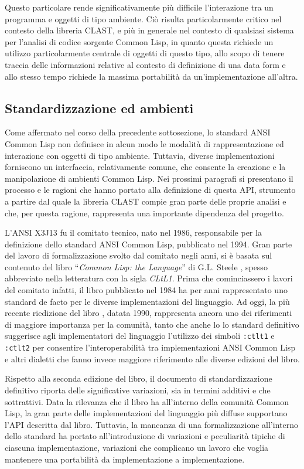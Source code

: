Questo particolare rende significativamente più difficile l'interazione tra un
programma e oggetti di tipo ambiente. Ciò risulta particolarmente critico nel
contesto della libreria CLAST, e più in generale nel contesto di qualsiasi
sistema per l'analisi di codice sorgente Common Lisp, in quanto questa richiede
un utilizzo particolarmente centrale di oggetti di questo tipo, allo scopo di
tenere traccia delle informazioni relative al contesto di definizione di una
data form e allo stesso tempo richiede la massima portabilità da
un'implementazione all'altra.

\subsection{Standardizzazione ed ambienti}

Come affermato nel corso della precedente sottosezione, lo standard ANSI Common
Lisp non definisce in alcun modo le modalità di rappresentazione ed interazione
con oggetti di tipo ambiente. Tuttavia, diverse implementazioni forniscono un
interfaccia, relativamente comune, che consente la creazione e la manipolazione
di ambienti Common Lisp. Nei prossimi paragrafi si presentano il processo e le
ragioni che hanno portato alla definizione di questa API, strumento a partire
dal quale la libreria CLAST compie gran parte delle proprie analisi e che, per
questa ragione, rappresenta una importante dipendenza del progetto.

L’ANSI X3J13 fu il comitato tecnico, nato nel 1986, responsabile per la
definizione dello standard ANSI Common Lisp, pubblicato nel 1994. Gran parte del
lavoro di formalizzazione svolto dal comitato negli anni, si è basata sul
contenuto del libro \enquote{\textit{Common Lisp: the Language}} di G.L. Steele
\cite{steele1984common}, spesso abbreviato nella letteratura con la sigla
\textit{CLtL1}. Prima che cominciassero i lavori del comitato infatti, il libro
pubblicato nel 1984 ha per anni rappresentato uno standard de facto per le
diverse implementazioni del linguaggio. Ad oggi, la più recente riedizione del
libro \cite{steele1990common}, datata 1990, rappresenta ancora uno dei
riferimenti di maggiore importanza per la comunità, tanto che anche lo lo
standard definitivo suggerisce agli implementatori del linguaggio l’utilizzo dei
simboli \texttt{:ctlt1} e \texttt{:ctlt2} per consentire l’interoperabilità tra
implementazioni ANSI Common Lisp e altri dialetti che fanno invece maggiore
riferimento alle diverse edizioni del libro.

Rispetto alla seconda edizione del libro, il documento di standardizzazione
definitivo riporta delle significative variazioni, sia in termini additivi e che
sottrattivi. Data la rilevanza che il libro ha all’interno della comunità Common
Lisp, la gran parte delle implementazioni del linguaggio più diffuse supportano
l’API descritta dal libro. Tuttavia, la mancanza di una formalizzazione
all’interno dello standard ha portato all’introduzione di variazioni e
peculiarità tipiche di ciascuna implementazione, variazioni che complicano un
lavoro che voglia mantenere una portabilità da implementazione a
implementazione.

